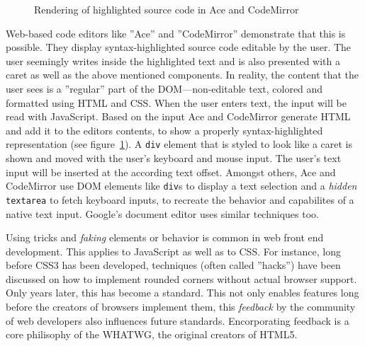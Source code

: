 \begin{figure}[!htb]
\centering
{}
\caption{Rendering of highlighted source code in Ace and CodeMirror}
\label{fig:ace_rendering_uml}
\end{figure}


Web-based code editors like ''Ace'' and ''CodeMirror'' demonstrate that this is possible. They display syntax-highlighted source code editable by the user. The user seemingly writes inside the highlighted text and is also presented with a caret as well as the above mentioned components. In reality, the content that the user sees is a ''regular'' part of the DOM---non-editable text, colored and formatted using HTML and CSS. When the user enters text, the input will be read with JavaScript. Based on the input Ace and CodeMirror generate HTML and add it to the editors contents, to show a properly syntax-highlighted representation (see figure~\ref{fig:ace_rendering_uml}). A \texttt{div} element that is styled to look like a caret is shown and moved with the user's keyboard and mouse input. The user's text input will be inserted at the according text offset. Amongst others, Ace and CodeMirror use DOM elements like \texttt{div}s to display a text selection and a \textit{hidden} \texttt{textarea} to fetch keyboard inputs, to recreate the behavior and capabilites of a native text input. Google's document editor uses similar techniques too.




Using tricks and \textit{faking} elements or behavior is common in web front end development. This applies to JavaScript as well as to CSS. For instance, long before CSS3 has been developed, techniques (often called ''hacks'') have been discussed on how to implement rounded corners without actual browser support. Only years later, this has become a standard. This not only enables features long before the creators of browsers implement them, this \textit{feedback} by the community of web developers also influences future standards. Encorporating feedback is a core philisophy of the WHATWG, the original creators of HTML5.

